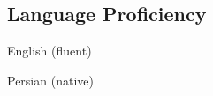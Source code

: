 \documentclass[../main.tex]{subfiles}
\begin{document}
\begin{category}
\section{Language Proficiency}
    \begin{enumerate*}[label=$\diamond$]
        \item English (fluent) \qquad \qquad \qquad
        \item Persian (native) \qquad \qquad \qquad
    \end{enumerate*}
\end{category}
\end{document}
